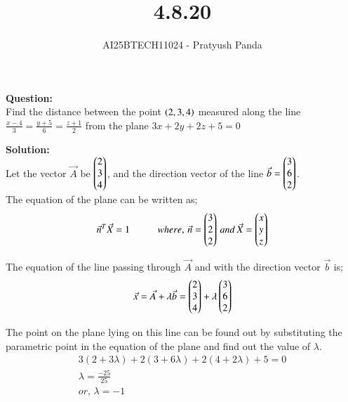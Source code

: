 \documentclass[journal]{IEEEtran}
\begin{document}

\vspace{3cm}

\title{4.8.20}
\author{AI25BTECH11024 - Pratyush Panda
}
\maketitle
{\let\newpage\relax\maketitle}

\renewcommand{\thefigure}{\theenumi}
\renewcommand{\thetable}{\theenumi}
\setlength{\intextsep}{10pt} %


\renewcommand{\thetable}{\theenumi}

\textbf{Question: } \\
Find the distance between the point $\left(2,3,4\right)$ measured along the line $\frac{x-4}{3}=\frac{y+5}{6}=\frac{z+1}{2}$ from the plane $3x+2y+2z+5=0$
\vspace{0.7cm}

\textbf{Solution: } \\
Let the vector $\Vec{A}$ be $\begin{pmatrix}2 \\ 3 \\ 4\end{pmatrix}$, and the direction vector of the line $\Vec{b}=\begin{pmatrix}3 \\ 6 \\ 2\end{pmatrix}$. \\
The equation of the plane can be written as;
\begin{align}
\Vec{n}^T\Vec{X}=1 \hspace{1cm} where, \, \Vec{n}=\begin{pmatrix}3 \\ 2 \\ 2\end{pmatrix} \, and \, \Vec{X}=\begin{pmatrix}x \\ y \\ z\end{pmatrix}
\end{align}

The equation of the line passing through $\Vec{A}$ and with the direction vector $\Vec{b}$ is;
\begin{align}   
\Vec{x}=\Vec{A}+\lambda\Vec{b}=\begin{pmatrix}2 \\ 3 \\ 4\end{pmatrix}+\lambda\begin{pmatrix}3 \\ 6 \\ 2\end{pmatrix}
\end{align}

The point on the plane lying on this line can be found out by substituting the parametric point in the equation of the plane and find out the value of $\lambda$. \\
\begin{align}
3(2+3\lambda)+2(3+6\lambda)+2(4+2\lambda)+5=0 \\
\lambda=\frac{-25}{25} \\
or, \, \lambda=-1
\end{align}
\end{document}
